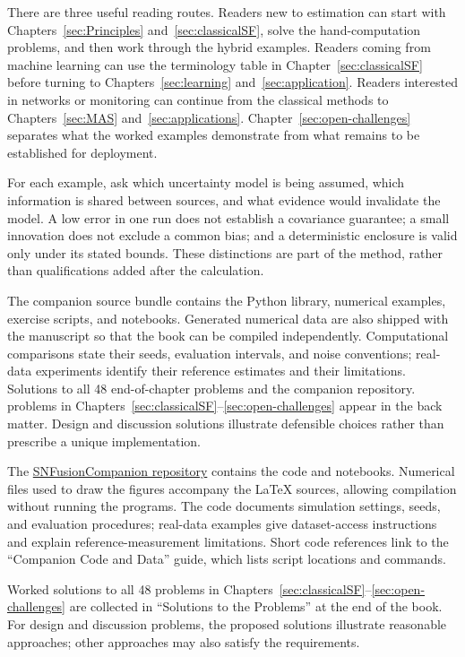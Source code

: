 \documentclass[graybox,envcountchap]{style/SNmono}
\providecommand{\DIFadd}[1]{{\protect\color{blue} #1}} %
\providecommand{\DIFdel}[1]{{\protect\color{red} #1}} %
\providecommand{\DIFaddbegin}{} %
\providecommand{\DIFaddend}{} %
\providecommand{\DIFdelbegin}{} %
\providecommand{\DIFdelend}{} %
\DeclareRobustCommand{\RtwoDel}[1]{{\color{red}%
  \renewcommand{\DIFadd}[1]{##1}\renewcommand{\DIFdel}[1]{##1}%
  #1}}
\DeclareRobustCommand{\RtwoAdd}[1]{{\color{blue}#1}}
\begin{document}
\DIFadd{There are three useful reading routes. Readers new to estimation can start with Chapters~\ref{sec:Principles} and~\ref{sec:classicalSF}, solve the hand-computation problems, and then work through the hybrid examples. Readers coming from machine learning can use the terminology table in Chapter~\ref{sec:classicalSF} before turning to Chapters~\ref{sec:learning} and~\ref{sec:application}. Readers interested in networks or monitoring can continue from the classical methods to Chapters~\ref{sec:MAS} and~\ref{sec:applications}. Chapter~\ref{sec:open-challenges} separates what the worked examples demonstrate from what remains to be established for deployment.
}

\DIFadd{For each example, ask which uncertainty model is being assumed, which information is shared between sources, and what evidence would invalidate the model. A low error in one run does not establish a covariance guarantee; a small innovation does not exclude a common bias; and a deterministic enclosure is valid only under its stated bounds. These distinctions are part of the method, rather than qualifications added after the calculation.
}

\RtwoDel{\DIFadd{The companion source bundle contains the Python library, numerical examples, exercise scripts, and notebooks. Generated numerical data are also shipped with the manuscript so that the book can be compiled independently. Computational comparisons state their seeds, evaluation intervals, and noise conventions; real-data experiments identify their reference estimates and their limitations. Solutions to all 48 }\DIFaddend end-of-chapter \DIFdelbegin \DIFdel{problems and the companion repository. }%
\DIFdelend \DIFaddbegin \DIFadd{problems in Chapters~\ref{sec:classicalSF}--\ref{sec:open-challenges} appear in the back matter. Design and discussion solutions illustrate defensible choices rather than prescribe a unique implementation.
}\DIFaddend }\RtwoAdd{The \href{https://github.com/DrFuzzy/SNFusionCompanion}{SNFusionCompanion repository} contains the code and notebooks. Numerical files used to draw the figures accompany the LaTeX sources, allowing compilation without running the programs. The code documents simulation settings, seeds, and evaluation procedures; real-data examples give dataset-access instructions and explain reference-measurement limitations. Short code references link to the ``Companion Code and Data'' guide, which lists script locations and commands.

Worked solutions to all 48 problems in Chapters~\ref{sec:classicalSF}--\ref{sec:open-challenges} are collected in ``Solutions to the Problems'' at the end of the book. For design and discussion problems, the proposed solutions illustrate reasonable approaches; other approaches may also satisfy the requirements.}
\end{document}

